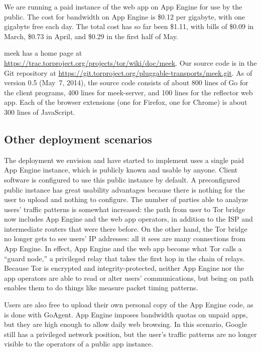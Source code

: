 \documentclass{article}
\def\meekserver{\mbox{meek-server}}
\begin{document}
We are running a paid instance of the web app on App Engine for use by the public.
The cost for bandwidth on App Engine is \$0.12 per gigabyte,
with one gigabyte free each day.
The total cost has so far been \$1.11, with bills of
\$0.09 in March,
\$0.73 in April,
and \$0.29 in the first half of May.

meek has a home page at
\url{https://trac.torproject.org/projects/tor/wiki/doc/meek}.
Our source code is in the Git repository at
\url{https://git.torproject.org/pluggable-transports/meek.git}.
As of version 0.5 (May~7, 2014), the source code consists of
about 800 lines of Go for the client programs,
400 lines for \meekserver, and
100 lines for the reflector web app.
Each of the browser extensions
(one for Firefox, one for Chrome)
is about 300 lines of JavaScript.

\subsection{Other deployment scenarios}
\label{sec:otherdeployment}

The deployment we envision and have started to implement
uses a single paid App Engine instance, which is publicly known and usable by anyone.
Client software is configured to use this public instance by default.
A preconfigured public instance has great usability advantages
because there is nothing for the user to upload and nothing to configure.
The number of parties able to analyze users' traffic patterns is somewhat increased:
the path from user to Tor bridge now includes App Engine and the web app operators,
in addition to the ISP and intermediate routers that were there before.
On the other hand, the Tor bridge no longer gets to see users' IP addresses:
all it sees are many connections from App Engine.
In effect, App Engine and the web app become what Tor calls a ``guard node,''
a privileged relay that takes the first hop in the chain of relays.
Because Tor is encrypted and integrity-protected, neither App Engine nor the app operators
are able to read or alter users' communications, but being on path enables them
to do things like measure packet timing patterns.

Users are also free to upload their own personal copy of the App Engine code, as is done with GoAgent.
App Engine imposes bandwidth quotas on unpaid apps, but they are high enough to allow daily web browsing.
In this scenario, Google still has a privileged network position,
but the user's traffic patterns are no longer visible to the operators of a public app instance.
\end{document}
